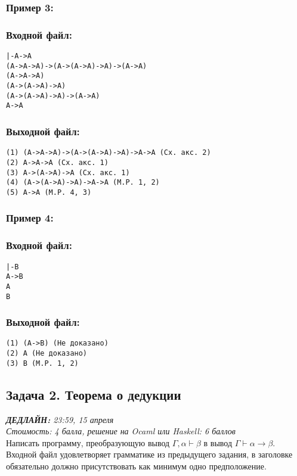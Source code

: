 \documentclass[11pt,a4paper,oneside]{article}
\begin{document}
\subsubsection*{Пример 3:}
\begin{minipage}[t]{.5\textwidth}
\subsubsection*{Входной файл:}
\begin{verbatim}
|-A->A
(A->A->A)->(A->(A->A)->A)->(A->A)
(A->A->A)
(A->(A->A)->A)
(A->(A->A)->A)->(A->A)
A->A
\end{verbatim}
\end{minipage}
\begin{minipage}[t]{.5\textwidth}
\subsubsection*{Выходной файл:}
\begin{verbatim}
(1) (A->A->A)->(A->(A->A)->A)->A->A (Сх. акс. 2)
(2) A->A->A (Сх. акс. 1)
(3) A->(A->A)->A (Сх. акс. 1)
(4) (A->(A->A)->A)->A->A (M.P. 1, 2)
(5) A->A (M.P. 4, 3)
\end{verbatim}
\end{minipage}

\subsubsection*{Пример 4:}
\begin{minipage}[t]{.5\textwidth}
\subsubsection*{Входной файл:}
\begin{verbatim}
|-B
A->B
A
B
\end{verbatim}
\end{minipage}
\begin{minipage}[t]{.5\textwidth}
\subsubsection*{Выходной файл:}
\begin{verbatim}
(1) (A->B) (Не доказано)
(2) A (Не доказано)
(3) B (M.P. 1, 2)
\end{verbatim}
\end{minipage}

\subsection*{Задача 2. Теорема о дедукции}
{\it \textbf{ДЕДЛАЙН:} 23:59, 15 апреля }\vspace{2mm}\\
{\it Стоимость: 4 балла, решение на Ocaml или Haskell: 6 баллов }\vspace{2mm}\\
Написать программу, преобразующую вывод $\Gamma, \alpha \vdash \beta$ в вывод
$\Gamma \vdash \alpha \rightarrow \beta$.
Входной файл удовлетворяет грамматике из предыдущего задания,
в заголовке обязательно должно присутствовать как минимум одно предположение.
\end{document}
